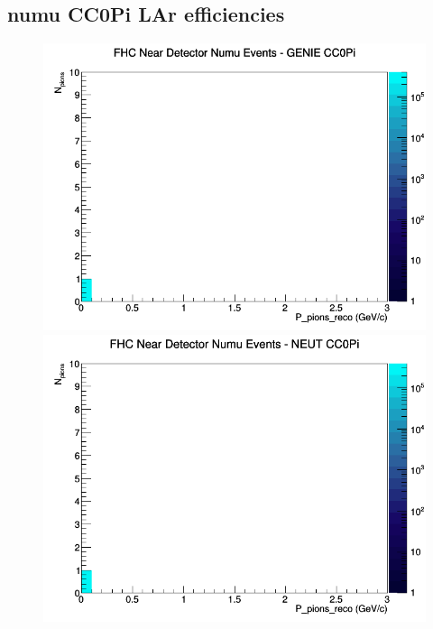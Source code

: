\documentclass[12pt]{article}
\begin{document}
\subsection{numu CC0Pi LAr efficiencies}
\begin{figure}[h]
\includegraphics[width=\linewidth]{eff_N_P/LAr/pions/CC0Pi_FHC_ND_numu_N_P_GENIE.png}
\endminipage
{}
\includegraphics[width=\linewidth]{eff_N_P/LAr/pions/CC0Pi_FHC_ND_numu_N_P_NEUT.png}
\endminipage
{}

\end{figure}
\end{document}
